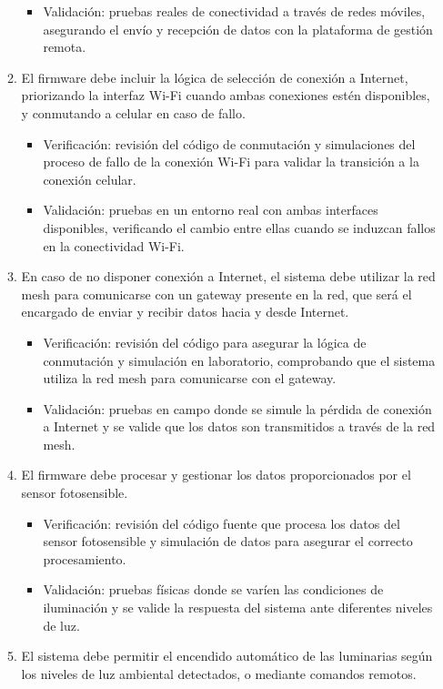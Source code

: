 \documentclass[
11pt, %
]{charter}
\begin{document}
\begin{enumerate}
\begin{enumerate}
\begin{itemize}
				\item Validación: pruebas reales de conectividad a través de redes móviles, asegurando el envío y recepción de datos con la plataforma de gestión remota.
				\end{itemize}
			\item El firmware debe incluir la lógica de selección de conexión a Internet, priorizando la interfaz Wi-Fi cuando ambas conexiones estén disponibles, y conmutando a celular en caso de fallo.
				\begin{itemize}
				\item Verificación: revisión del código de conmutación y simulaciones del proceso de fallo de la conexión Wi-Fi para validar la transición a la conexión celular.
				\item Validación: pruebas en un entorno real con ambas interfaces disponibles, verificando el cambio entre ellas cuando se induzcan fallos en la conectividad Wi-Fi.
				\end{itemize}
			\item En caso de no disponer conexión a Internet, el sistema debe utilizar la red mesh para comunicarse con un gateway presente en la red, que será el encargado de enviar y recibir datos hacia y desde Internet. 
				\begin{itemize}
				\item Verificación: revisión del código para asegurar la lógica de conmutación y simulación en laboratorio, comprobando que el sistema utiliza la red mesh para comunicarse con el gateway.
				\item Validación: pruebas en campo donde se simule la pérdida de conexión a Internet y se valide que los datos son transmitidos a través de la red mesh.
				\end{itemize}
			\item El firmware debe procesar y gestionar los datos proporcionados por el sensor fotosensible.
				\begin{itemize}
				\item Verificación: revisión del código fuente que procesa los datos del sensor fotosensible y simulación de datos para asegurar el correcto	procesamiento.
				\item Validación: pruebas físicas donde se varíen las condiciones de iluminación y se valide la respuesta del sistema ante diferentes niveles de luz.
				\end{itemize}
\pagebreak
			\item El sistema debe permitir el encendido automático de las luminarias según los niveles de luz ambiental detectados, o mediante comandos remotos.

\end{enumerate}
\end{enumerate}
\end{document}
